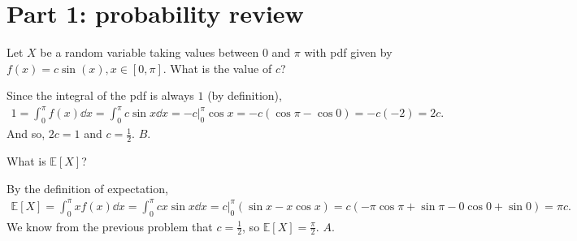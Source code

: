 \documentclass[a4paper]{article}
\begin{document}
\section{Part 1: probability review}
\begin{Exercise}
	Let $X$ be a random variable taking values between $0$ and $\pi$ with pdf given by $f(x) = c\sin(x), x \in [0, \pi].$ What is the value of $c$?
\end{Exercise}
\begin{Solution}
	Since the integral of the pdf is always $1$ (by definition),
	\begin{align*}
		1 = \int_{0}^{\pi} f(x) \dd{x} = \int_{0}^{\pi} c \sin x \dd{x} = -c \Big|_{0}^{\pi} \cos x = -c (\cos \pi - \cos 0) = -c (-2) = 2c. 
	\end{align*}
	And so, $2c = 1$ and $c = \frac{1}{2}$. $\boxed{B}$.
\end{Solution}
\begin{Exercise}
	What is $\mathbb{E}[X]$?
\end{Exercise}
\begin{Solution}
	By the definition of expectation, 
	\begin{align*}
		\mathbb{E}[X] = \int_{0}^{\pi} x f(x) \dd{x} = \int_0^{\pi} c x \sin x \dd{x} = c \Big|_0^{\pi} \left( \sin x - x \cos x \right) = c (-\pi \cos \pi + \sin \pi - 0 \cos 0 + \sin 0) = \pi c.
	\end{align*}
	We know from the previous problem that $c = \frac{1}{2}$, so $\mathbb{E}[X] = \frac{\pi}{2}.$ $\boxed{A}$.
\end{Solution}
\end{document}
